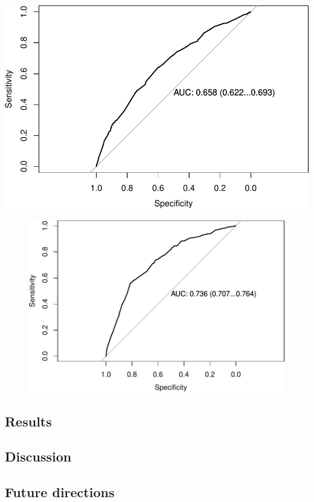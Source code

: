 \documentclass[11pt,]{article}
\begin{document}
\includegraphics{report2_files/figure-latex/plot-hac2011-females-4.pdf}

\begin{figure}[htbp]
\centering
\includegraphics{report2_files/figure-latex/subdivide-diabetes2004-1.pdf}
\caption{}
\end{figure}

\subsection{Results}\label{results}

\subsection{Discussion}\label{discussion}

\subsection{Future directions}\label{future-directions}
\end{document}
